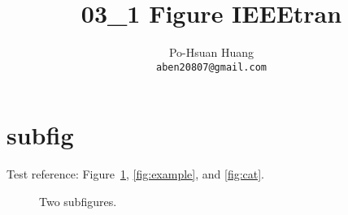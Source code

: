 \documentclass[conference,10pt]{IEEEtran}
\title{03\_1 Figure IEEEtran}
\author{Po-Hsuan Huang\\ 
    \texttt{aben20807@gmail.com}
}
\begin{document}
\vspace*{-50pt}
    {\let\newpage\relax\maketitle}

\section{subfig}

Test reference: Figure~\ref{fig:all}, \ref{fig:example}, and \ref{fig:cat}.

\begin{figure}[htb!]
    \centering
    \hfill%
    \caption{Two subfigures.}
    \label{fig:all}
  \end{figure}
\end{document}
